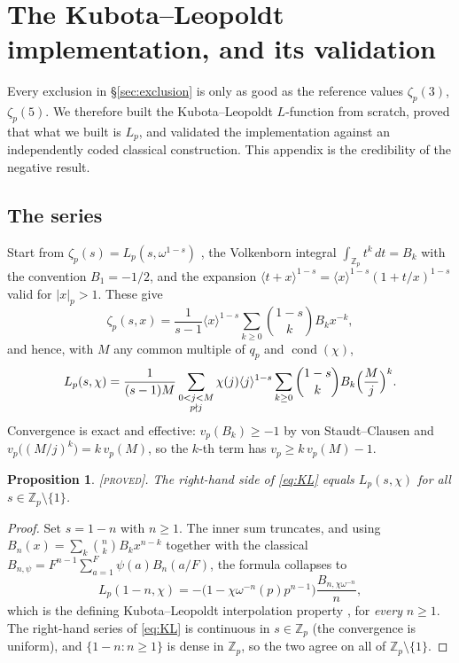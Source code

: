 \documentclass[11pt,reqno]{article}
\newcommand{\Zp}{\mathbb{Z}_p}
\newcommand{\vp}{v_p}
\DeclareMathOperator{\cond}{cond}
\newcommand{\PROVED}{{\normalfont\textsc{[proved]}}}
\theoremstyle{plain}
\newtheorem{proposition}[theorem]{Proposition}
\theoremstyle{definition}
\theoremstyle{remark}
\numberwithin{equation}{section}
\begin{document}
\appendix

\section{The Kubota--Leopoldt implementation, and its validation}\label{app:KL}

Every exclusion in \S\ref{sec:exclusion} is only as good as the reference values
$\zeta_p(3)$, $\zeta_p(5)$.  We therefore built the Kubota--Leopoldt
$L$-function from scratch, proved that what we built is $L_p$, and validated the
implementation against an independently coded classical construction.  This
appendix is the credibility of the negative result.

\subsection{The series}\label{app:KLseries}

Start from $\zeta_p(s)=L_p(s,\omega^{1-s})$ \cite[Def.~8]{LSZ2025}, the
Volkenborn integral $\int_{\Zp}t^k\,dt=B_k$ with the convention $B_1=-1/2$, and
the expansion $\langle t+x\rangle^{1-s}=\langle x\rangle^{1-s}(1+t/x)^{1-s}$
valid for $|x|_p>1$.  These give
\[
  \zeta_p(s,x)=\frac{1}{s-1}\langle x\rangle^{1-s}
    \sum_{k\ge0}\binom{1-s}{k}B_kx^{-k},
\]
and hence, with $M$ any common multiple of $q_p$ and $\cond(\chi)$,
\begin{equation}\label{eq:KL}
  L_p(s,\chi)=\frac{1}{(s-1)M}
    \sum_{\substack{0<j<M\\ p\nmid j}}\chi(j)\langle j\rangle^{1-s}
    \sum_{k\ge0}\binom{1-s}{k}B_k\Bigl(\frac{M}{j}\Bigr)^{k}.
\end{equation}
Convergence is exact and effective: $\vp(B_k)\ge-1$ by von Staudt--Clausen and
$\vp\bigl((M/j)^k\bigr)=k\,\vp(M)$, so the $k$-th term has
$\vp\ge k\,\vp(M)-1$.

\begin{proposition}\label{prop:isKL}
\PROVED.  The right-hand side of \eqref{eq:KL} equals $L_p(s,\chi)$ for all
$s\in\Zp\setminus\{1\}$.
\end{proposition}

\begin{proof}
Set $s=1-n$ with $n\ge1$.  The inner sum truncates, and using
$B_n(x)=\sum_k\binom{n}{k}B_kx^{n-k}$ together with the classical
$B_{n,\psi}=F^{n-1}\sum_{a=1}^{F}\psi(a)B_n(a/F)$, the formula collapses to
\[
  L_p(1-n,\chi)=-\bigl(1-\chi\omega^{-n}(p)p^{n-1}\bigr)
    \frac{B_{n,\chi\omega^{-n}}}{n},
\]
which is the defining Kubota--Leopoldt interpolation property
\cite{KubotaLeopoldt1964}, for \emph{every} $n\ge1$.  The right-hand
series of \eqref{eq:KL} is continuous in $s\in\Zp$ (the convergence is uniform),
and $\{1-n:n\ge1\}$ is dense in $\Zp$, so the two agree on all of
$\Zp\setminus\{1\}$.
\end{proof}
\end{document}
